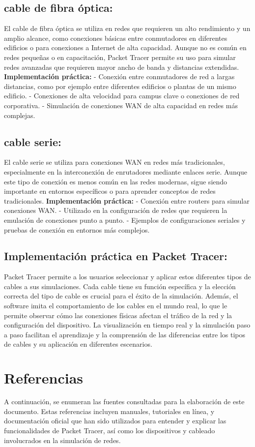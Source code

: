 \documentclass[a4paper,12pt]{article}
\begin{document}
\subsection{cable de fibra óptica:}
El cable de fibra óptica se utiliza en redes que requieren un alto rendimiento y un amplio alcance, como conexiones básicas entre conmutadores en diferentes edificios o para conexiones a Internet de alta capacidad. Aunque no es común en redes pequeñas o en capacitación, Packet Tracer permite su uso para simular redes avanzadas que requieren mayor ancho de banda y distancias extendidas.
\textbf{Implementación práctica:}
- Conexión entre conmutadores de red a largas distancias, como por ejemplo entre diferentes edificios o plantas de un mismo edificio. - Conexiones de alta velocidad para campus clave o conexiones de red corporativa. - Simulación de conexiones WAN de alta capacidad en redes más complejas.
\subsection{cable serie:}
El cable serie se utiliza para conexiones WAN en redes más tradicionales, especialmente en la interconexión de enrutadores mediante enlaces serie. Aunque este tipo de conexión es menos común en las redes modernas, sigue siendo importante en entornos específicos o para aprender conceptos de redes tradicionales.
\textbf{Implementación práctica:}
- Conexión entre routers para simular conexiones WAN. - Utilizado en la configuración de redes que requieren la emulación de conexiones punto a punto. - Ejemplos de configuraciones seriales y pruebas de conexión en entornos más complejos.
\subsection{Implementación práctica en Packet Tracer:}
Packet Tracer permite a los usuarios seleccionar y aplicar estos diferentes tipos de cables a sus simulaciones. Cada cable tiene su función específica y la elección correcta del tipo de cable es crucial para el éxito de la simulación. Además, el software imita el comportamiento de los cables en el mundo real, lo que le permite observar cómo las conexiones físicas afectan el tráfico de la red y la configuración del dispositivo. La visualización en tiempo real y la simulación paso a paso facilitan el aprendizaje y la comprensión de las diferencias entre los tipos de cables y su aplicación en diferentes escenarios.

\section{Referencias}
A continuación, se enumeran las fuentes consultadas para la elaboración de este documento. Estas referencias incluyen manuales, tutoriales en línea, y documentación oficial que han sido utilizados para entender y explicar las funcionalidades de Packet Tracer, así como los dispositivos y cableado involucrados en la simulación de redes.
\end{document}
